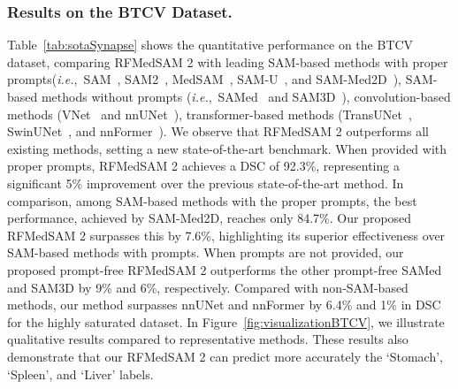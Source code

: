 \subsubsection{Results on the BTCV Dataset.} 
Table~\ref{tab:sotaSynapse} shows the quantitative performance on the BTCV dataset, comparing RFMedSAM 2 with leading SAM-based methods with proper prompts(\textit{i.e.},~SAM~\cite{kirillov2023segment}, SAM2~\cite{ravi2024sam}, MedSAM~\cite{ma2024segment}, SAM-U~\cite{deng2023sam}, and SAM-Med2D~\cite{cheng2023sam}), SAM-based methods without prompts (\textit{i.e.},~SAMed~\cite{zhang2023customized} and SAM3D~\cite{bui2023sam3d}), convolution-based methods (VNet~\cite{ronneberger2015u} and nnUNet~\cite{isensee2019automated}), transformer-based methods (TransUNet~\cite{chen2021transunet}, SwinUNet~\cite{cao2021swin}, 
and nnFormer~\cite{zhou2021nnformer}). 
We observe that RFMedSAM 2 outperforms all existing methods, setting a new state-of-the-art benchmark. When provided with proper prompts, RFMedSAM 2 achieves a DSC of 92.3\%, representing a significant 5\% improvement over the previous state-of-the-art method. In comparison, among SAM-based methods with the proper prompts, the best performance, achieved by SAM-Med2D, reaches only 84.7\%. Our proposed RFMedSAM 2 surpasses this by 7.6\%, highlighting its superior effectiveness over SAM-based methods with prompts. When prompts are not provided, our proposed prompt-free RFMedSAM 2 outperforms the other prompt-free SAMed and SAM3D by 9\% and 6\%, respectively. Compared with non-SAM-based methods, our method surpasses nnUNet and nnFormer by 6.4\% and 1\% in DSC for the highly saturated dataset. In Figure~\ref{fig:visualizationBTCV}, we illustrate qualitative results compared to representative methods. These results also demonstrate that our RFMedSAM 2 can predict more accurately the `Stomach', `Spleen', and `Liver' labels. 



